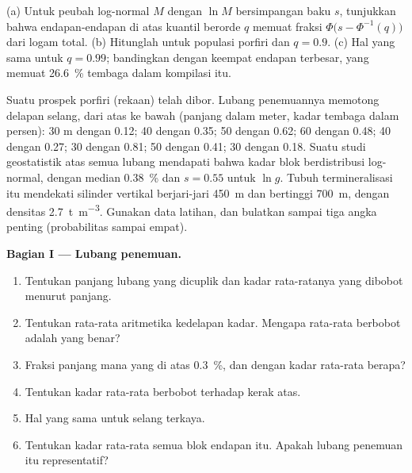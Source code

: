 \begin{exercise}[$\star\star\star$]\label{exo:b2:ore-deposits:12}
(a) Untuk peubah log-normal $M$ dengan $\ln M$ bersimpangan baku $s$, tunjukkan bahwa endapan-endapan di atas
kuantil berorde $q$ memuat fraksi $\Phi\bigl(s - \Phi^{-1}(q)\bigr)$ dari logam total.
(b) Hitunglah untuk populasi porfiri dan $q = 0.9$. (c) Hal yang sama untuk $q = 0.99$; bandingkan dengan
keempat endapan terbesar, yang memuat \qty{26.6}{\percent} tembaga dalam kompilasi itu.
\end{exercise}

\begin{problem}\label{pb:b2:ore-deposits:1}
Suatu prospek porfiri (rekaan) telah dibor. Lubang penemuannya memotong delapan selang, dari atas
ke bawah (panjang dalam meter, kadar tembaga dalam persen): 30 m dengan 0.12; 40 dengan 0.35; 50 dengan 0.62; 60
dengan 0.48; 40 dengan 0.27; 30 dengan 0.81; 50 dengan 0.41; 30 dengan 0.18. Suatu studi geostatistik atas semua lubang
mendapati bahwa kadar blok berdistribusi log-normal, dengan median \qty{0.38}{\percent} dan $s = 0.55$ untuk
$\ln g$. Tubuh termineralisasi itu mendekati silinder vertikal berjari-jari \qty{450}{m} dan bertinggi
\qty{700}{m}, dengan densitas \qty{2.7}{t.m^{-3}}. Gunakan data latihan, dan bulatkan sampai tiga
angka penting (probabilitas sampai empat).

\noindent\textbf{Bagian I --- Lubang penemuan.}
\begin{enumerate}
  \item Tentukan panjang lubang yang dicuplik dan kadar rata-ratanya yang dibobot menurut panjang.
  \item Tentukan rata-rata aritmetika kedelapan kadar. Mengapa rata-rata berbobot adalah yang benar?
  \item Fraksi panjang mana yang di atas \qty{0.3}{\percent}, dan dengan kadar rata-rata berapa?
  \item Tentukan  kadar rata-rata berbobot terhadap kerak atas.
  \item Hal yang sama untuk selang terkaya.
  \item Tentukan kadar rata-rata semua blok endapan itu. Apakah lubang penemuan itu representatif?
\end{enumerate}


\end{problem}
